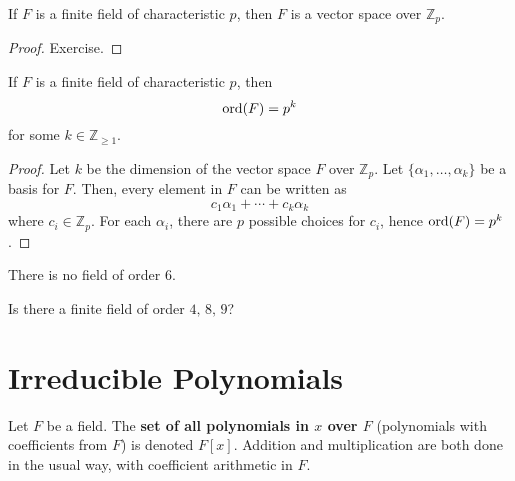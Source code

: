 \begin{thmbox}
    \begin{theorem}
        If $ F $ is a finite field of characteristic $ p $, then $ F $
        is a vector space over $ \mathbb{Z}_p $.
    \end{theorem}
\end{thmbox}

\begin{proof}
    Exercise.
\end{proof}

\begin{thmbox}
    \begin{theorem}
        If $ F $ is a finite field of characteristic $ p $, then
        \[ \operatorname{ord}(F)=p^k \]
        for some $ k\in\mathbb{Z}_{\geqslant 1} $.
    \end{theorem}
\end{thmbox}

\begin{proof}
    Let $ k $ be the dimension of the vector space $ F $ over $ \mathbb{Z}_p $.
    Let $ \{\alpha_1,\ldots ,\alpha_k\} $ be a basis for $ F $. Then, every element
    in $ F $ can be written as
    \[ c_1\alpha_1+\cdots+c_k\alpha_k \]
    where $ c_i\in\mathbb{Z}_p $. For each $ \alpha_i $, there are $ p $
    possible choices for $ c_i $, hence $ \operatorname{ord}(F)=p^k $.
\end{proof}

\begin{exbox}
    \begin{example}
    There is no field of order $ 6 $.
    \end{example}
\end{exbox}

 Is there a finite field of order $ 4,\,8,\,9 $?

\section{Irreducible Polynomials}

\begin{defbox}
    \begin{definition}
        Let $ F $ be a field. The \textbf{set of all polynomials in $ x $ over $ F $}
        (polynomials with coefficients from $ F $) is denoted $ F[x] $. Addition
        and multiplication are both done in the usual way, with coefficient arithmetic
        in $ F $.
    \end{definition}
\end{defbox}

